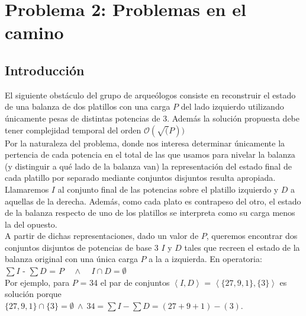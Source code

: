 \section{Problema 2: Problemas en el camino}

\subsection{Introducción}
	El siguiente obstáculo del grupo de arqueólogos consiste en reconstruir el estado de una balanza de dos platillos con una carga $P$ del lado izquierdo utilizando únicamente pesas de distintas potencias de 3. Además la solución propuesta debe tener complejidad temporal del orden $\mathcal{O}(\sqrt(P))$
	\\

	Por la naturaleza del problema, donde nos interesa determinar únicamente la pertencia de cada potencia en el total de las que usamos para nivelar la balanza (y distinguir a qué lado de la balanza van) la representación del estado final de cada platillo por separado mediante conjuntos disjuntos resulta apropiada. Llamaremos $I$ al conjunto final de las potencias sobre el platillo izquierdo y $D$ a aquellas de la derecha. Además, como cada plato es contrapeso del otro, el estado de la balanza respecto de uno de los platillos se interpreta como su carga menos la del opuesto.
	\\

	A partir de dichas representaciones, dado un valor de $P$, queremos encontrar dos conjuntos disjuntos de potencias de base 3 $I$ y $D$ tales que recreen el estado de la balanza original con una única carga $P$ a la a izquierda. En operatoria:
	\\

	$\sum I$ - $\sum D$ = $P$ \ \ $\wedge$ \ \ $I \cap D = \emptyset$
	\\

	Por ejemplo, para $P$ = 34 el par de conjuntos $\left \langle I,D  \right \rangle$ = $\left \langle \{27,9,1\},\{3\}  \right \rangle$ es solución porque \\
	$\{27,9,1\} \cap \{3\} = \emptyset \ \wedge \ 34 = \sum I - \sum D = (27+9+1)-(3)$.
	\\



\newpage

